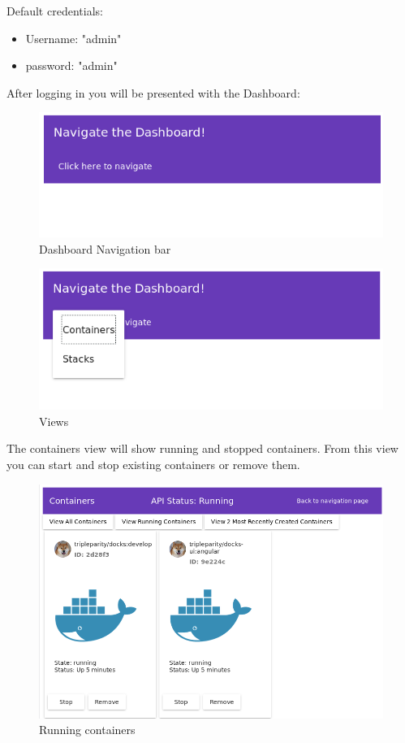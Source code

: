 \documentclass[]{article}
\begin{document}
Default credentials:
\begin{itemize}
	\item Username: "admin"
	\item password: "admin"
\end{itemize}

After logging in you will be presented with the Dashboard:
\begin{figure}[H]
	\centering
	\includegraphics[scale=0.5]{manual_nav.png}
	\caption{Dashboard Navigation bar}
\end{figure}

\begin{figure}[H]
	\centering
	\includegraphics[scale=0.5]{manual_nav_select.png}
	\caption{Views}
\end{figure}

The containers view will show running and stopped containers.
From this view you can start and stop existing containers or remove them.
\begin{figure}[H]
	\centering
	\includegraphics[scale=0.5]{manual_containers.png}
	\caption{Running containers}
\end{figure}
\end{document}
